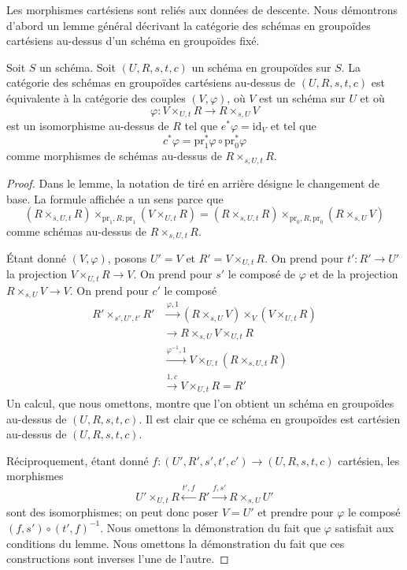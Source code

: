 \noindent
Les morphismes cartésiens sont reliés aux données de descente. Nous démontrons d'abord un
lemme général décrivant la catégorie des schémas en groupoïdes cartésiens au-dessus d'un
schéma en groupoïdes fixé.

\begin{lemma}
\label{lemma-characterize-cartesian-schemes}
Soit $S$ un schéma. Soit $(U, R, s, t, c)$ un schéma en groupoïdes sur $S$.
La catégorie des schémas en groupoïdes cartésiens au-dessus de $(U, R, s, t, c)$
est équivalente à la catégorie des couples $(V, \varphi)$, où $V$ est un
schéma sur $U$ et où
$$
\varphi :
V \times_{U, t} R
\longrightarrow
R \times_{s, U} V
$$
est un isomorphisme au-dessus de $R$ tel que $e^*\varphi = \text{id}_V$ et tel que
$$
c^*\varphi = \text{pr}_1^*\varphi \circ \text{pr}_0^*\varphi
$$
comme morphismes de schémas au-dessus de $R \times_{s, U, t} R$.
\end{lemma}

\begin{proof}
Dans le lemme, la notation de tiré en arrière désigne le changement de base. La formule
affichée a un sens parce que
$$
(R \times_{s, U, t} R) \times_{\text{pr}_1, R, \text{pr}_1} (V \times_{U, t} R)
=
(R \times_{s, U, t} R) \times_{\text{pr}_0, R, \text{pr}_0} (R \times_{s, U} V)
$$
comme schémas au-dessus de $R \times_{s, U, t} R$.

\medskip\noindent
Étant donné $(V, \varphi)$, posons $U' = V$ et $R' = V \times_{U, t} R$.
On prend pour $t' : R' \to U'$ la projection $V \times_{U, t} R \to V$.
On prend pour $s'$ le composé de $\varphi$ et de la projection
$R \times_{s, U} V \to V$. On prend pour $c'$ le composé
\begin{align*}
R' \times_{s', U', t'} R'
& \xrightarrow{\varphi, 1}
(R \times_{s, U} V) \times_V (V \times_{U, t} R) \\
& \xrightarrow{}
R \times_{s, U} V \times_{U, t} R \\
& \xrightarrow{\varphi^{-1}, 1}
V \times_{U, t} (R \times_{s, U, t} R) \\
& \xrightarrow{1, c}
V \times_{U, t} R = R'
\end{align*}
Un calcul, que nous omettons, montre que l'on obtient un schéma en groupoïdes
au-dessus de $(U, R, s, t, c)$. Il est clair que ce schéma en groupoïdes est
cartésien au-dessus de $(U, R, s, t, c)$.

\medskip\noindent
Réciproquement, étant donné $f : (U', R', s', t', c') \to (U, R, s, t, c)$
cartésien, les morphismes
$$
U' \times_{U, t} R \xleftarrow{t', f} R' \xrightarrow{f, s'} R \times_{s, U} U'
$$
sont des isomorphismes; on peut donc poser $V = U'$ et prendre pour $\varphi$ le
composé $(f, s') \circ (t', f)^{-1}$. Nous omettons la démonstration du fait que
$\varphi$ satisfait aux conditions du lemme. Nous omettons la démonstration du fait que
ces constructions sont inverses l'une de l'autre.
\end{proof}

